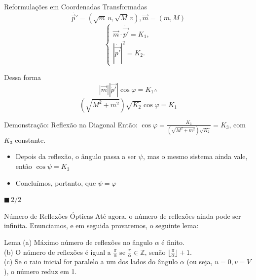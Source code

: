 \documentclass{beamer}
\begin{document}
\begin{frame}{Reformulações em Coordenadas Transformadas}
  $$\dot{\vec p'}=(\sqrt m\,u,\sqrt M\,v), \vec m=(m,M)$$
  \begin{equation*}
    \begin{cases}\vec m\cdot\dot{\vec{p'}}=K_1,\\|\dot{\vec{p'}}|^2=K_2.\end{cases}
  \end{equation*}

  Dessa forma
  $$|\vec{m}| |\vec{\dot p'}| \cos{\varphi} = K_1 \therefore$$
  $$(\sqrt{M^2+m^2}) \sqrt{K_2} \cos{\varphi} = K_1$$
\end{frame}

\begin{frame}{Demonstração: Reflexão na Diagonal}
  Então:
  $\cos{\varphi} = \frac{K_1}{(\sqrt{M^2+m^2}) \sqrt{K_2}} = K_3$, com $K_3$ constante.
  \begin{itemize}
    \item Depois da reflexão, o ângulo passa a ser $\psi$, mas o mesmo sistema ainda vale, então $\cos{\psi} = K_3$
    \item Concluímos, portanto, que $\psi = \varphi$
  \end{itemize}
  $\blacksquare \, 2/2$
\end{frame}

\begin{frame}{Número de Reflexões Ópticas}
  Até agora, o número de reflexões ainda pode ser infinita. 
  Enunciamos, e em seguida provaremos, o seguinte lema:
  \begin{block}{Lema}
    (a) Máximo número de reflexões no ângulo $\alpha$ é finito.\\
    (b) O número de reflexões é igual a $\frac{\pi}{\alpha}$ se $\frac{\pi}{\alpha}\in\mathbb Z$, senão $\lfloor\frac{\pi}{\alpha}\rfloor+1$.\\
    (c) Se o raio inicial for paralelo a um dos lados do ângulo $\alpha$ (ou seja, $u=0,v=V$), o número reduz em 1.
  \end{block}
\end{frame}
\end{document}
